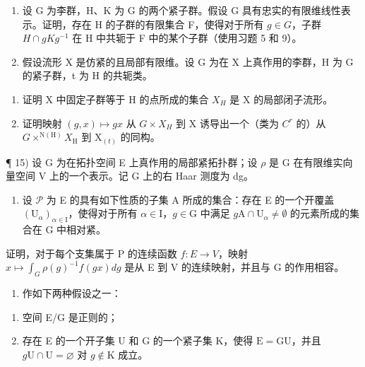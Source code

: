\begin{enumerate}
\def\labelenumi{\arabic{enumi})}
\setcounter{enumi}{12}
\item
  设 G 为李群，H、K 为 G 的两个紧子群。假设 G 具有忠实的有限维线性表示。证明，存在 H 的子群的有限集合 F，使得对于所有 \(g \in G\)，子群 \(H \cap gKg^{-1}\) 在 H 中共轭于 F 中的某个子群（使用习题 5 和 9）。
\item
  假设流形 X 是仿紧的且局部有限维。设 G 为在 X 上真作用的李群，H 为 G 的紧子群，t 为 H 的共轭类。
\end{enumerate}

\begin{enumerate}
\def\labelenumi{\alph{enumi})}
\item
  证明 X 中固定子群等于 H 的点所成的集合 \(X_{H}\) 是 X 的局部闭子流形。
\item
  证明映射 \((g,x)\mapsto gx\) 从 \(G\times X_{H}\) 到 X 诱导出一个（类为 \(C^{r}\) 的）从 \(G\times^{\mathrm{N(H)}}X_{\mathrm{H}}\) 到 \(\mathrm{X}_{(t)}\) 的同构。
\end{enumerate}

¶ 15) 设 G 为在拓扑空间 E 上真作用的局部紧拓扑群；设 \(\rho\) 是 G 在有限维实向量空间 V 上的一个表示。记 G 上的右 Haar 测度为 dg。

\begin{enumerate}
\def\labelenumi{\alph{enumi})}
\tightlist
\item
  设 \(\mathcal{P}\) 为 E 的具有如下性质的子集 A 所成的集合：存在 E 的一个开覆盖 \((\mathrm{U}_{\alpha})_{\alpha \in \mathrm{I}}\)，使得对于所有 \(\alpha \in \mathrm{I}\)，\(g \in \mathrm{G}\) 中满足 \(g\mathrm{A} \cap \mathrm{U}_{\alpha} \neq \emptyset\) 的元素所成的集合在 G 中相对紧。
\end{enumerate}

证明，对于每个支集属于 P 的连续函数 \(f: E \to V\)，映射 \(x \mapsto \int_{G} \rho(g)^{-1} f(gx) dg\) 是从 E 到 V 的连续映射，并且与 G 的作用相容。

\begin{enumerate}
\def\labelenumi{\alph{enumi})}
\setcounter{enumi}{1}
\tightlist
\item
  作如下两种假设之一：
\end{enumerate}

\begin{enumerate}
\def\labelenumi{(\roman{enumi})}
\item
  空间 E/G 是正则的；
\item
  存在 E 的一个开子集 U 和 G 的一个紧子集 K，使得 \(\mathrm{E} = \mathrm{GU}\)，并且 \(g\mathrm{U}\cap \mathrm{U} = \varnothing\) 对 \(g\notin \mathrm{K}\) 成立。
\end{enumerate}

